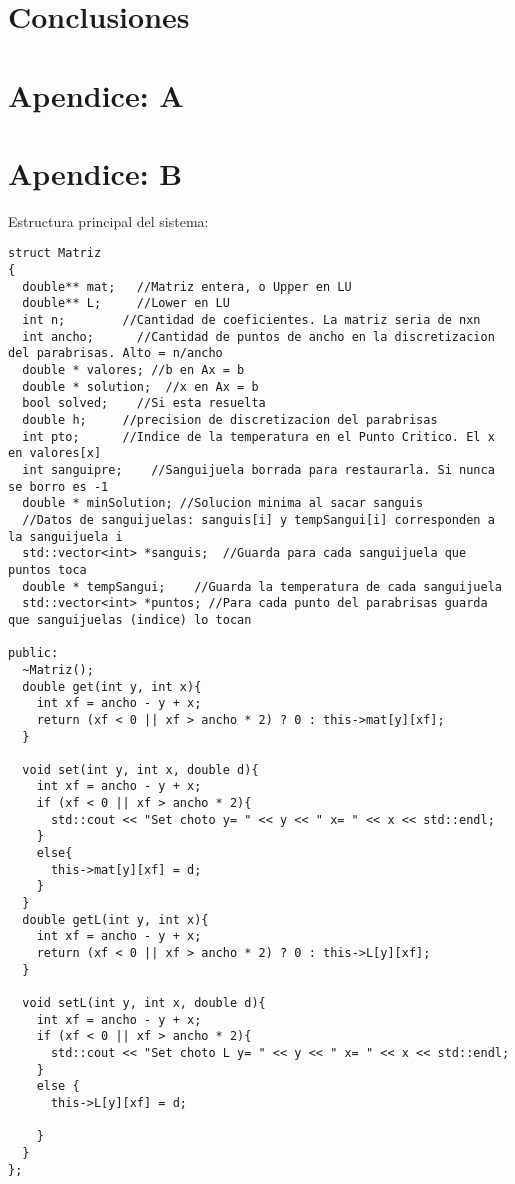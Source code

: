 \documentclass[a4paper]{article}
\begin{document}
\newpage
\section{Conclusiones}

\section{Apendice: A}
\begin{center}


\end{center}
\newpage
\section{Apendice: B}

Estructura principal del sistema:
\begin{lstlisting}
struct Matriz
{
  double** mat;   //Matriz entera, o Upper en LU 
  double** L;     //Lower en LU
  int n;        //Cantidad de coeficientes. La matriz seria de nxn
  int ancho;      //Cantidad de puntos de ancho en la discretizacion del parabrisas. Alto = n/ancho
  double * valores; //b en Ax = b
  double * solution;  //x en Ax = b
  bool solved;    //Si esta resuelta
  double h;     //precision de discretizacion del parabrisas
  int pto;      //Indice de la temperatura en el Punto Critico. El x en valores[x]
  int sanguipre;    //Sanguijuela borrada para restaurarla. Si nunca se borro es -1
  double * minSolution; //Solucion minima al sacar sanguis
  //Datos de sanguijuelas: sanguis[i] y tempSangui[i] corresponden a la sanguijuela i
  std::vector<int> *sanguis;  //Guarda para cada sanguijuela que puntos toca
  double * tempSangui;    //Guarda la temperatura de cada sanguijuela
  std::vector<int> *puntos; //Para cada punto del parabrisas guarda que sanguijuelas (indice) lo tocan

public:
  ~Matriz();
  double get(int y, int x){
    int xf = ancho - y + x;
    return (xf < 0 || xf > ancho * 2) ? 0 : this->mat[y][xf];
  }

  void set(int y, int x, double d){
    int xf = ancho - y + x;
    if (xf < 0 || xf > ancho * 2){
      std::cout << "Set choto y= " << y << " x= " << x << std::endl;
    }
    else{
      this->mat[y][xf] = d;
    }
  }
  double getL(int y, int x){
    int xf = ancho - y + x;
    return (xf < 0 || xf > ancho * 2) ? 0 : this->L[y][xf];
  }

  void setL(int y, int x, double d){
    int xf = ancho - y + x;
    if (xf < 0 || xf > ancho * 2){
      std::cout << "Set choto L y= " << y << " x= " << x << std::endl;
    }
    else {
      this->L[y][xf] = d;

    }
  }
};
\end{lstlisting}
\end{document}

